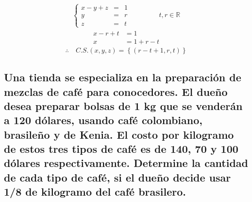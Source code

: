 \documentclass[10pt, a4paper]{article}
\begin{document}
  \begin{align*}
    \left\{
    \begin{array}{rcl}
      x-y+z &= &1\\
      y &= &r\\
      z &= &t
    \end{array}
    \right.\ &&\hspace{1cm}t,r\in\mathbb{R}
    \end{align*}
    \begin{align*}
      x-r+t &= 1\\
      x &= 1+r-t
    \end{align*}
    \begin{align*}
      \therefore \ &C.S. \left(x,y,z\right) = \left\{\left(r-t+1,r,t\right)\right\}
    \end{align*}
\newpage
\subsection{Una tienda se especializa en la preparación de mezclas de café para conocedores. El dueño desea preparar bolsas de 1 kg que se venderán a 120 dólares, usando café colombiano, brasileño y de Kenia. El costo por kilogramo de estos tres tipos de café es de 140, 70 y 100 dólares respectivamente. Determine la cantidad de cada tipo de café, si el dueño decide usar 1/8 de kilogramo del café brasilero.}
\newpage
\end{document}
